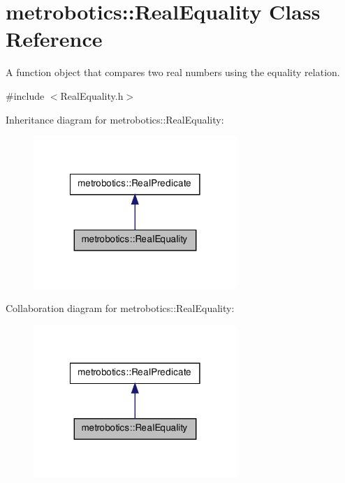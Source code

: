 \hypertarget{classmetrobotics_1_1RealEquality}{\section{metrobotics\-:\-:\-Real\-Equality \-Class \-Reference}
\label{classmetrobotics_1_1RealEquality}
}


\-A function object that compares two real numbers using the equality relation.  




{\ttfamily \#include $<$\-Real\-Equality.\-h$>$}



\-Inheritance diagram for metrobotics\-:\-:\-Real\-Equality\-:
\nopagebreak
\begin{figure}[H]
\begin{center}
\leavevmode
\includegraphics[width=218pt]{classmetrobotics_1_1RealEquality__inherit__graph}
\end{center}
\end{figure}


\-Collaboration diagram for metrobotics\-:\-:\-Real\-Equality\-:
\nopagebreak
\begin{figure}[H]
\begin{center}
\leavevmode
\includegraphics[width=218pt]{classmetrobotics_1_1RealEquality__coll__graph}
\end{center}
\end{figure}
